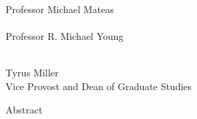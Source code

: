 \begin{titlepage}
{Professor Michael Mateas \\
\vspace{2.5\baselineskip}
\underline{\hspace{15em}} \\
Professor R. Michael Young \\
\vspace{2.5\baselineskip}
\underline{\hspace{15em}}
}
\raggedright
\vspace{2.5\baselineskip}
\underline{\hspace{15em}} \\
Tyrus Miller \\
Vice Provost and Dean of Graduate Studies
\end{titlepage}

\newpage

\thispagestyle{empty}
\newpage

\tableofcontents

\listoffigures

\listoftables
{}

\newpage

\vspace{0.5em}
{
\huge
\centering
Abstract \\
}
\vspace*{1em}


\addtolength{\baselineskip}{0pt plus 1pt minus 1pt}



\newpage

